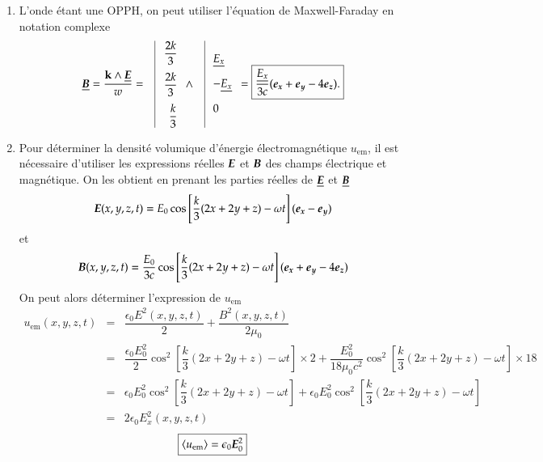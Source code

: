\begin{corrige}
\begin{enumerate}
	\item L'onde étant une OPPH, on peut utiliser l'équation de Maxwell-Faraday
	      en notation complexe
	      \begin{equation*}
		      \complex{\vecb} = \dfrac{\vec{k} \wedge \complex{\vece}}{w} = \quad
		      \vline
		      \begin{array}{r}
			      \dfrac{2k}{3} \\[1em]
			      \dfrac{2k}{3} \\[1em]
			      \dfrac{k}{3}
		      \end{array}
		      \wedge \quad 
		      \vline
		      \begin{array}{l}
			      \complex{E_x} \\[1em]
			      -\complex{E_x} \\[1em]
			      0 
		      \end{array}
		      = \boxed{\dfrac{\complex{E_x}}{3c}(\ex + \ey - 4\ez).}
	     \end{equation*}
	\item Pour déterminer la densité volumique d'énergie électromagnétique
	      $u_\mathrm{em}$, il est nécessaire d'utiliser les expressions
	      réelles $\vece$ et $\vecb$ des champs électrique et magnétique. 
	      On les obtient en prenant les parties réelles de $\complex{\vece}$
	      et $\complex{\vecb}$
	      \begin{equation*}
		      \vece(x, y, z, t) = E_0 \cos\left[
		      \dfrac{k}{3}(2x + 2y +z) - \omega t \right](\ex - \ey)
	      \end{equation*}
	      et
	      \begin{equation*}
		      \vecb(x, y, z, t) = \dfrac{E_0}{3c} \cos\left[
		      \dfrac{k}{3}(2x + 2y +z) - \omega t \right](\ex + \ey - 4\ez)
	      \end{equation*}
	      On peut alors déterminer l'expression de $u_\mathrm{em}$
	      \begin{equation*}
		      \begin{array}{rcl}
			      u_\mathrm{em}(x, y, z, t) &=& 
			\dfrac{\epsilon_0 E^2(x, y, z, t)}{2} 
			+ \dfrac{B^2(x, y, z, t)}{2 \mu_0} \\[1em]
			   &=& \dfrac{\epsilon_0 E_0^2}{2} \cos^2\left[
		      \dfrac{k}{3}(2x + 2y +z) - \omega t \right] \times 2 +
		      \dfrac{E_0^2}{18 \mu_0 c^2} \cos^2\left[
		      \dfrac{k}{3}(2x + 2y +z) - \omega t \right] \times 18 \\[1em]
		      	  &=& \epsilon_0 E_0^2 \cos^2\left[
		      \dfrac{k}{3}(2x + 2y +z) - \omega t \right] +
		      \epsilon_0 E_0 ^2 \cos^2\left[
		      \dfrac{k}{3}(2x + 2y +z) - \omega t \right]\\[1em]
			  &=& 2 \epsilon_0 E_x^2(x, y, z, t)
		      \end{array}
	      \end{equation*}
	      \begin{equation*}
		      \boxed{
		      \langle u_\mathrm{em} \rangle = \epsilon_0 \vece_0^2
	      }
      	     \end{equation*}


\end{enumerate}
\end{corrige}
